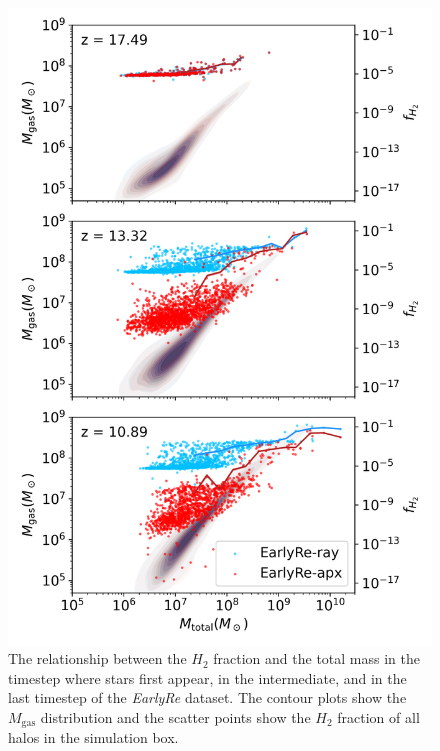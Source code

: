 \documentclass[linenumbers, twocolumn]{aastex631}
\begin{document}
\begin{figure}[h]
    \centering
    \includegraphics[width=0.9\columnwidth]{EarlyRe/h2_frac_gasmass_distribution_EarlyRe_shinbad.png}
    \caption{The relationship between the $H_{2}$ fraction and the total mass in the timestep where stars first appear, in the intermediate, and in the last timestep of the \textit{EarlyRe} dataset. The contour plots show the $M_{\text{gas}}$ distribution and the scatter points show the $H_{2}$ fraction of all halos in the simulation box.}
    \label{fig:H2_frac_EarlyRe}
\end{figure}
\end{document}
